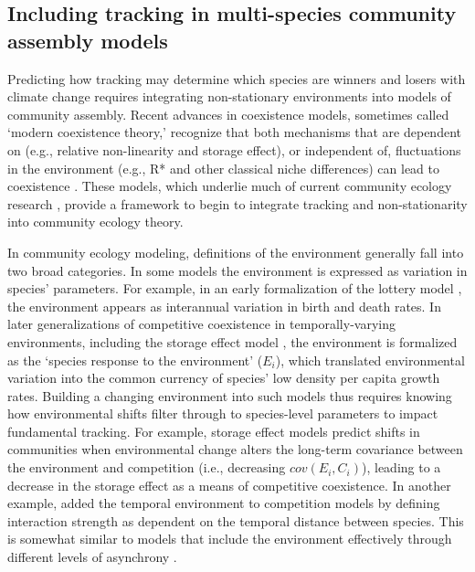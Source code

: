 \documentclass[11pt,letterpaper]{article}
\begin{document}
\subsection{Including tracking in multi-species community assembly models} 
Predicting how tracking may determine which species are winners and losers with climate change requires integrating non-stationary environments into models of community assembly. Recent advances in coexistence models, sometimes called `modern coexistence theory,' recognize that both mechanisms 
that are dependent on (e.g., relative non-linearity and storage effect), or independent of, fluctuations in the environment (e.g., R* and other classical niche differences) can lead to coexistence \citep{Chesson:1997dz,Chesson:2000vd}. These models, which underlie much of current community ecology research \citep{Mayfield:2010fe,barabas2018,ellner2019}, provide a framework to begin to integrate tracking and non-stationarity into community ecology theory.

In community ecology modeling, definitions of the environment generally fall into two broad categories. In some models the environment is expressed as variation in species' parameters. For example, in an early formalization of the lottery model \citep{chesson1981}, the environment appears as interannual variation in birth and death rates.  In later generalizations of competitive coexistence in temporally-varying environments, including the storage effect model \citep{Chesson:1997dz}, the environment is formalized as the `species response to the environment' ($E_i$), which translated environmental variation into the common currency of species' low density per capita growth rates. Building a changing environment into such models thus requires knowing how environmental shifts filter through to species-level parameters \citep{Tuljapurkar2009} to impact fundamental tracking. For example, storage effect models predict shifts in communities when environmental change alters the long-term covariance between the environment and competition (i.e., decreasing $cov(E_i, C_i)$), leading to a decrease in the storage effect as a means of competitive coexistence. In another example, \citet{volkerass} added the temporal environment to competition models by defining interaction strength as dependent on the temporal distance between species. This is somewhat similar to models that include the environment effectively through different levels of asynchrony \citep[e.g.,][]{Nakazawa2012,revilla2014}. 
\end{document}
